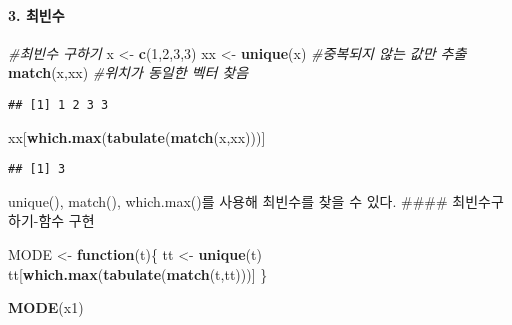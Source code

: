 \documentclass[
]{article}
\newenvironment{Shaded}{\begin{snugshade}}{\end{snugshade}}
\newcommand{\CommentTok}[1]{\textcolor[rgb]{0.56,0.35,0.01}{\textit{#1}}}
\newcommand{\ControlFlowTok}[1]{\textcolor[rgb]{0.13,0.29,0.53}{\textbf{#1}}}
\newcommand{\DecValTok}[1]{\textcolor[rgb]{0.00,0.00,0.81}{#1}}
\newcommand{\FunctionTok}[1]{\textcolor[rgb]{0.13,0.29,0.53}{\textbf{#1}}}
\newcommand{\NormalTok}[1]{#1}
\newcommand{\OtherTok}[1]{\textcolor[rgb]{0.56,0.35,0.01}{#1}}
\begin{document}
\hypertarget{uxcd5cuxbe48uxc218}{%
\paragraph{3. 최빈수}\label{uxcd5cuxbe48uxc218}}

\begin{Shaded}
\begin{Highlighting}[]
\CommentTok{\#최빈수 구하기 }
\NormalTok{x }\OtherTok{\textless{}{-}} \FunctionTok{c}\NormalTok{(}\DecValTok{1}\NormalTok{,}\DecValTok{2}\NormalTok{,}\DecValTok{3}\NormalTok{,}\DecValTok{3}\NormalTok{)}
\NormalTok{xx }\OtherTok{\textless{}{-}} \FunctionTok{unique}\NormalTok{(x) }\CommentTok{\#중복되지 않는 값만 추출 }
\FunctionTok{match}\NormalTok{(x,xx)     }\CommentTok{\#위치가 동일한 벡터 찾음 }
\end{Highlighting}
\end{Shaded}

\begin{verbatim}
## [1] 1 2 3 3
\end{verbatim}

\begin{Shaded}
\begin{Highlighting}[]
\NormalTok{xx[}\FunctionTok{which.max}\NormalTok{(}\FunctionTok{tabulate}\NormalTok{(}\FunctionTok{match}\NormalTok{(x,xx)))]}
\end{Highlighting}
\end{Shaded}

\begin{verbatim}
## [1] 3
\end{verbatim}

unique(), match(), which.max()를 사용해 최빈수를 찾을 수 있다. \#\#\#\#
최빈수구하기-함수 구현

\begin{Shaded}
\begin{Highlighting}[]
\NormalTok{MODE }\OtherTok{\textless{}{-}} \ControlFlowTok{function}\NormalTok{(t)\{}
\NormalTok{    tt }\OtherTok{\textless{}{-}} \FunctionTok{unique}\NormalTok{(t)}
\NormalTok{    tt[}\FunctionTok{which.max}\NormalTok{(}\FunctionTok{tabulate}\NormalTok{(}\FunctionTok{match}\NormalTok{(t,tt)))]}
\NormalTok{\}}
\end{Highlighting}
\end{Shaded}

\begin{Shaded}
\begin{Highlighting}[]
\FunctionTok{MODE}\NormalTok{(x1)}
\end{Highlighting}
\end{Shaded}
\end{document}
